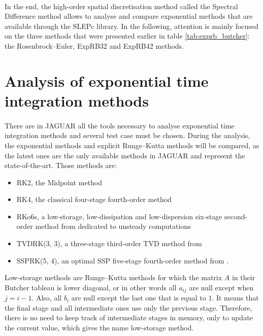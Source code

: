     \paragraph{}
    In the end, the high-order spatial discretisation method called the Spectral Difference method allows to analyse and compare exponential methods that are available through the SLEPc library.
    In the following, attention is mainly focused on the three methods that were presented earlier in table \ref{tab:exprb_butcher}: the Rosenbrock--Euler, ExpRB32 and ExpRB42 methods.


  \section{Analysis of exponential time integration methods}

    \paragraph{}
    There are in JAGUAR all the tools necessary to analyse exponential time integration methods and several test case must be chosen.
    During the analysis, the exponential methods and explicit Runge--Kutta methods will be compared, as the latest ones are the only available methods in JAGUAR and represent the state-of-the-art.
    Those methods are:
    \begin{itemize}
      \item RK2, the Midpoint method
      \item RK4, the classical four-stage fourth-order method
      \item RKo6s, a low-storage, low-dissipation and low-dispersion six-stage second-order method from \cite{BogeyBailly2004} dedicated to unsteady computations
      \item TVDRK(3, 3), a three-stage third-order TVD method from \cite{ShuOsher1988, GottliebShu1996}
      \item SSPRK(5, 4), an optimal SSP five-stage fourth-order method from \cite{SpiteriRuuth2002}.
    \end{itemize}
    Low-storage methods are Runge--Kutta methods for which the matrix $A$ in their Butcher tableau is lower diagonal, or in other words all $a_{ij}$ are null except when $j = i - 1$.
    Also, all $b_i$ are null except the last one that is equal to $1$.
    It means that the final stage and all intermediate ones use only the previous stage.
    Therefore, there is no need to keep track of intermediate stages in memory, only to update the current value, which gives the name low-storage method.
